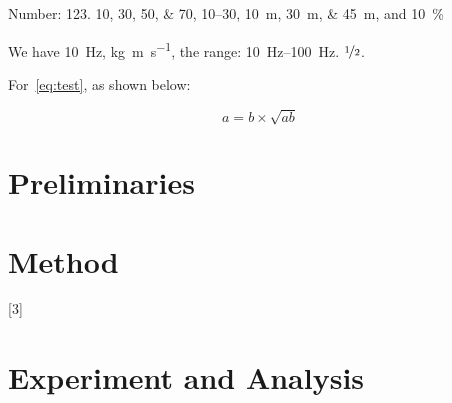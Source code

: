 

Number:
\num{123}.
\numlist{10;30;50;70},
\numrange{10}{30},
\SIlist{10;30;45}{\metre},
and
\SI{10}{\percent}



\begin{ConferenceOnly}
We have \SI{10}{\hertz},
\si{\kilogram\metre\per\second},
the range: \SIrange{10}{100}{\hertz}.
$\nicefrac[]{1}{2}$.


\end{ConferenceOnly}


For~\cref{eq:test},
as shown below:

\begin{equation}\label{eq:test}
a = b \times \sqrt{ab}
\end{equation}

\blindmathpaper

\section{Preliminaries} \label{sec-preliminaries}

\blindtext

\gliMarker  %


\section{Method} \label{sec-method}

\blindtext
{}[3]
\blinditemize
\blindenumerate

\blindmathtrue
\blindmathfalse
\blinddescription

\qwuMarker %

\section{Experiment and Analysis} \label{sec-experiment}


